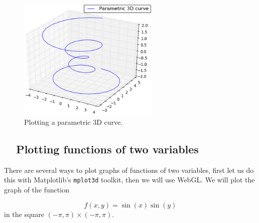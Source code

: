 \documentclass[article,A4,12pt]{llncs}
\begin{document}
\begin{figure}[!ht]
\begin{center}
\includegraphics[width=0.6\textwidth]{img/plot3d-1.png}
\end{center}
\vspace{-4mm}
\caption{Plotting a parametric 3D curve.}
\label{fig:plot3d-1}
\end{figure}


\subsection{\ \ Plotting functions of two variables}

There are several ways to plot graphs of functions of two variables, 
first let us do this with Matplotlib's {\tt mplot3d} toolkit, then we will
use WebGL. We will plot the graph of the function 

$$
  f(x, y) = \sin(x) \sin(y)
$$
in the square $(-\pi, \pi) \times (-\pi, \pi)$.
\end{document}
